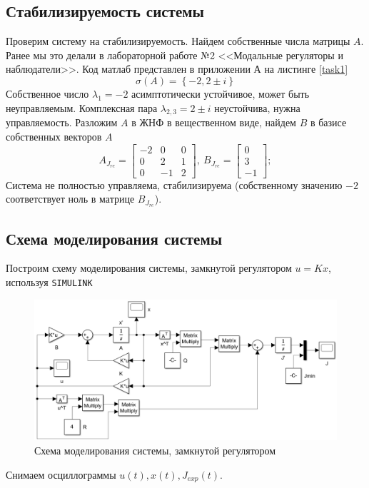 \documentclass[a4paper, 12pt]{article}
\begin{document}
    \subsection{Стабилизируемость системы}
    Проверим систему на стабилизируемость. Найдем собственные
    числа матрицы $A$. Ранее мы это делали в лабораторной работе
    №2 <<Модальные регуляторы и наблюдатели>>.
    Код матлаб представлен в приложении А на листинге \ref{task1}
    $$
    \sigma\left( A \right)=\left\{ -2,2\pm i \right\}
    $$
    Собственное число $\lambda_1=-2$ асимптотически устойчивое,
    может быть неуправляемым. Комплексная пара $\lambda_{2,3}=2\pm i$
    неустойчива, нужна управляемость. Разложим $A$ в ЖНФ в вещественном
    виде, найдем $B$ в базисе собственных векторов $A$
    $$
    A_{J_{re}}=\begin{bmatrix}
    -2     &0     &0\\
    0     &2     &1\\
    0    &-1     &2
    \end{bmatrix},\ B_{J_{re}}=\begin{bmatrix}
        0\\3\\-1
    \end{bmatrix};
    $$
    Система не полностью управляема, стабилизируема (собственному
    значению $-2$ соответствует ноль в матрице $B_{J_{re}}$).
    

    \subsection{Схема моделирования системы}
    Построим схему моделирования системы, замкнутой регулятором $u=Kx$,
    используя \texttt{SIMULINK}
    \begin{figure}[H]
        \centering
        \includegraphics[scale=0.35]{1task_scheme.png}
        \captionsetup{skip=0pt}
        \caption{Схема моделирования системы, замкнутой регулятором}
        \label{fig:1task_scheme}
    \end{figure}
    Снимаем осциллограммы $u(t),x(t),J_{exp}(t)$.
\end{document}
